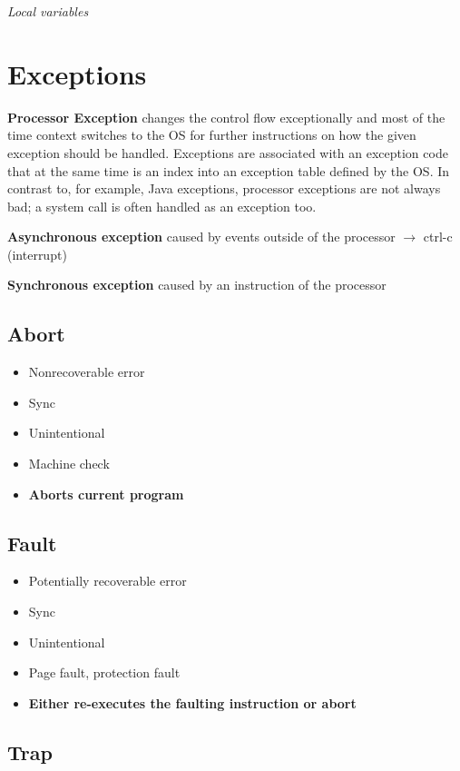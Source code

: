 \documentclass{article}
\begin{document}
\textit{Local variables}

\section{Exceptions}

\textbf{Processor Exception} changes the control flow exceptionally and most of the time context switches to the OS for further instructions on how the given exception should be handled. Exceptions are associated with an exception code that at the same time is an index into an exception table defined by the OS. In contrast to, for example, Java exceptions, processor exceptions are not always bad; a system call is often handled as an exception too.

\textbf{Asynchronous exception} caused by events outside of the processor $\rightarrow$ ctrl-c (interrupt)

\textbf{Synchronous exception} caused by an instruction of the processor

\subsection{Abort}

\begin{itemize}
    \item Nonrecoverable error
    \item Sync
    \item Unintentional
    \item Machine check
    \item \textbf{Aborts current program}
\end{itemize}

\subsection{Fault}

\begin{itemize}
    \item Potentially recoverable error
    \item Sync
    \item Unintentional
    \item Page fault, protection fault
    \item \textbf{Either re-executes the faulting instruction or abort}
\end{itemize}

\subsection{Trap}
\end{document}
